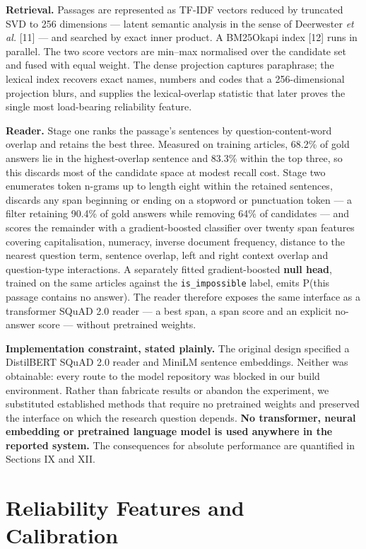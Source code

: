 \documentclass[conference]{IEEEtran}
\begin{document}
\textbf{Retrieval.} Passages are represented as TF-IDF vectors reduced by truncated SVD to 256 dimensions --- latent semantic analysis in the sense of Deerwester \emph{et al.} [11] --- and searched by exact inner product. A BM25Okapi index [12] runs in parallel. The two score vectors are min--max normalised over the candidate set and fused with equal weight. The dense projection captures paraphrase; the lexical index recovers exact names, numbers and codes that a 256-dimensional projection blurs, and supplies the lexical-overlap statistic that later proves the single most load-bearing reliability feature.

\textbf{Reader.} Stage one ranks the passage's sentences by question-content-word overlap and retains the best three. Measured on training articles, 68.2\% of gold answers lie in the highest-overlap sentence and 83.3\% within the top three, so this discards most of the candidate space at modest recall cost. Stage two enumerates token n-grams up to length eight within the retained sentences, discards any span beginning or ending on a stopword or punctuation token --- a filter retaining 90.4\% of gold answers while removing 64\% of candidates --- and scores the remainder with a gradient-boosted classifier over twenty span features covering capitalisation, numeracy, inverse document frequency, distance to the nearest question term, sentence overlap, left and right context overlap and question-type interactions. A separately fitted gradient-boosted \textbf{null head}, trained on the same articles against the \texttt{is\_impossible} label, emits P(this passage contains no answer). The reader therefore exposes the same interface as a transformer SQuAD 2.0 reader --- a best span, a span score and an explicit no-answer score --- without pretrained weights.

\textbf{Implementation constraint, stated plainly.} The original design specified a DistilBERT SQuAD 2.0 reader and MiniLM sentence embeddings. Neither was obtainable: every route to the model repository was blocked in our build environment. Rather than fabricate results or abandon the experiment, we substituted established methods that require no pretrained weights and preserved the interface on which the research question depends. \textbf{No transformer, neural embedding or pretrained language model is used anywhere in the reported system.} The consequences for absolute performance are quantified in Sections IX and XII.

\section{Reliability Features and Calibration}
\end{document}
